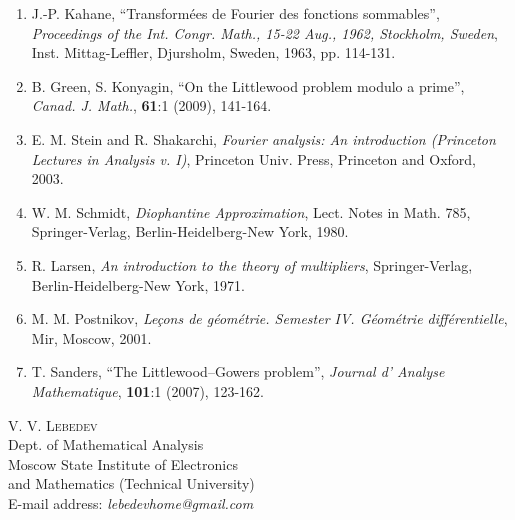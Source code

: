 \documentclass[12pt]{article}
\begin{document}
\begin{enumerate}
\item J.-P. Kahane, ``Transform\'ees de Fourier des fonctions
    sommables'', \emph{Proceedings of the Int. Congr. Math.,
    15-22 Aug., 1962, Stockholm, Sweden}, Inst.
    Mittag-Leffler, Djursholm, Sweden, 1963, pp. 114-131.

\item B. Green, S. Konyagin, ``On the Littlewood problem
    modulo a prime'', \emph{Canad. J. Math.}, \textbf{61}:1
    (2009), 141-164.

\item E. M. Stein and R. Shakarchi, \emph{Fourier analysis: An
    introduction (Princeton Lectures in Analysis v. I)},
    Princeton Univ. Press, Princeton and Oxford, 2003.

\item W. M. Schmidt, \emph{Diophantine Approximation}, Lect.
    Notes in Math. 785, Springer-Verlag, Berlin-Heidelberg-New
    York, 1980.

\item R. Larsen, \emph{An introduction to the theory of
    multipliers}, Springer-Verlag, Berlin-Heidelberg-New York,
    1971.

\item M. M. Postnikov, \emph{Le\c cons de g\'eom\'etrie.
    Semester IV. G\'eom\'etrie diff\'erentielle}, Mir, Moscow,
    2001.

\item T. Sanders, ``The Littlewood--Gowers problem'',
    \emph{Journal d' Analyse Mathematique}, \textbf{101}:1
    (2007), 123-162.

\end{enumerate}

\quad

\qquad \textsc{V. V. Lebedev}\\
\qquad Dept. of Mathematical Analysis\\
\qquad Moscow State Institute of Electronics\\
\qquad and Mathematics (Technical University)\\
\qquad E-mail address: \emph {lebedevhome@gmail.com}
\end{document}

